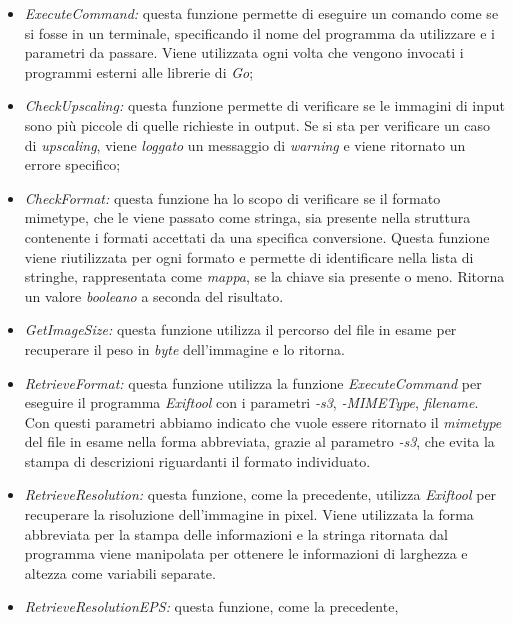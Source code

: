 \begin{itemize}
      \item \emph{ExecuteCommand:} questa funzione permette di eseguire un
            comando come se si fosse in un terminale, specificando il nome del
            programma da utilizzare e i parametri da passare. Viene utilizzata ogni
            volta che vengono invocati i programmi esterni alle librerie di \emph{Go};
      \item \emph{CheckUpscaling:} questa funzione permette di verificare se le
            immagini di input sono più piccole di quelle richieste in output. Se
            si sta per verificare un caso di \emph{upscaling}, viene
            \emph{loggato} un messaggio di \emph{warning} e viene ritornato un
            errore specifico;
      \item \emph{CheckFormat:} questa funzione ha lo scopo di verificare se il
            formato \glsfirstoccur\gls{mimetype}, che le viene passato come
            stringa, sia presente nella struttura contenente i formati accettati
            da una specifica conversione. Questa funzione viene riutilizzata per
            ogni formato e permette di identificare nella lista di stringhe,
            rappresentata come \emph{mappa}, se la chiave sia presente o meno.
            Ritorna un valore \emph{booleano} a seconda del risultato.
      \item \emph{GetImageSize:} questa funzione utilizza il percorso del file in
            esame per recuperare il peso in \emph{byte} dell'immagine e lo ritorna.
      \item \emph{RetrieveFormat:} questa funzione utilizza la funzione
            \emph{ExecuteCommand} per eseguire il programma \emph{Exiftool} con i
            parametri \emph{-s3}, \emph{-MIMEType}, \emph{filename}. Con questi
            parametri abbiamo indicato che vuole essere ritornato il \emph{mimetype} del
            file in esame nella forma abbreviata, grazie al parametro \emph{-s3}, che
            evita la stampa di descrizioni riguardanti il formato individuato.
      \item \emph{RetrieveResolution:} questa funzione, come la precedente,
            utilizza \emph{Exiftool} per recuperare la risoluzione dell'immagine in
            pixel. Viene utilizzata la forma abbreviata per la stampa delle informazioni
            e la stringa ritornata dal programma viene manipolata per ottenere le
            informazioni di larghezza e altezza come variabili separate.
      \item \emph{RetrieveResolutionEPS:} questa funzione, come la precedente,

\end{itemize}
